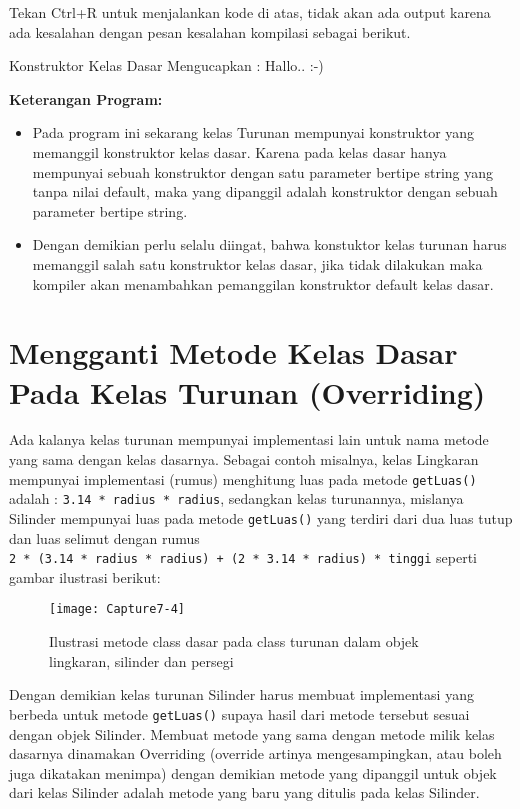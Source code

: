 Tekan Ctrl+R untuk menjalankan kode di atas, tidak akan ada output
karena ada kesalahan dengan pesan kesalahan kompilasi sebagai berikut.

\begin{lcverbatim}
Konstruktor Kelas Dasar 
Mengucapkan : Hallo.. :-)
\end{lcverbatim}
 

\textbf{Keterangan Program:}

\begin{itemize}

\item
  Pada program ini sekarang kelas Turunan mempunyai konstruktor yang
  memanggil konstruktor kelas dasar. Karena pada kelas dasar hanya
  mempunyai sebuah konstruktor dengan satu parameter bertipe string yang
  tanpa nilai default, maka yang dipanggil adalah konstruktor dengan
  sebuah parameter bertipe string.
\item
  Dengan demikian perlu selalu diingat, bahwa konstuktor kelas turunan
  harus memanggil salah satu konstruktor kelas dasar, jika tidak
  dilakukan maka kompiler akan menambahkan pemanggilan konstruktor
  default kelas dasar.
\end{itemize}

\section{Mengganti Metode Kelas Dasar Pada Kelas Turunan (Overriding)}\label{mengganti-metode-kelas-dasar-pada-kelas-turunan-overriding}

Ada kalanya kelas turunan mempunyai implementasi lain untuk nama metode
yang sama dengan kelas dasarnya. Sebagai contoh misalnya, kelas
Lingkaran mempunyai implementasi (rumus) menghitung luas pada metode
\texttt{getLuas()} adalah : \texttt{3.14\ *\ radius\ *\ radius},
sedangkan kelas turunannya, mislanya Silinder mempunyai luas pada metode
\texttt{getLuas()} yang terdiri dari dua luas tutup dan luas selimut
dengan rumus
\texttt{2\ *\ (3.14\ *\ radius\ *\ radius)\ +\ (2\ *\ 3.14\ *\ radius)\ *\ tinggi}
seperti gambar ilustrasi berikut:

\begin{figure}[htbp]
\centering
\texttt{[image: Capture7-4]}
\caption{Ilustrasi metode class dasar pada class turunan dalam objek lingkaran, silinder dan persegi}
\end{figure}

Dengan demikian kelas turunan Silinder harus membuat implementasi yang
berbeda untuk metode \texttt{getLuas()} supaya hasil dari metode
tersebut sesuai dengan objek Silinder. Membuat metode yang sama dengan
metode milik kelas dasarnya dinamakan Overriding (override artinya
mengesampingkan, atau boleh juga dikatakan menimpa) dengan demikian
metode yang dipanggil untuk objek dari kelas Silinder adalah metode yang
baru yang ditulis pada kelas Silinder.

